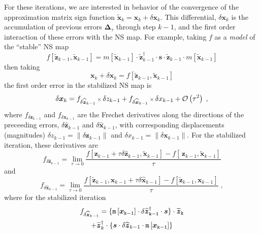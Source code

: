 \documentclass[letterpaper,twocolumn,amsmath,amsfont,amssymb,english,aps,jcp,preprintnumbers,groupaddress,nofootinbib,tightenlines]{revtex4}
\newcommand{\mat}[1]{\boldsymbol{#1}}
\begin{document}
For these iterations, we are interested in behavior of the convergence of the approximation matrix sign function 
$\widetilde{\mat{x}}_{k} = \mat{x}_{k} + \delta  \mat{x}_{k}$.  This differential, $\delta \mat{x}_k$ is the
accumulation of previous errors $\mat{\Delta}_\tau$ through step $k-1$, and the first order interaction
of these errors with the NS map.  For example, taking $f$ as a {\em model} of the ``stable'' NS map
\begin{equation}
f \left[\widetilde{\mat{z}}_{k-1} , \widetilde{\mat{x}}_{k-1} \right] =
m \left[ \widetilde{\mat{x}}_{k-1}\right] \cdot \widetilde{\mat{z}}^\dagger_{k-1}  
\cdot \mat{s} \cdot \widetilde{\mat{z}}_{k-1} \cdot m\left[ \widetilde{\mat{x}}_{k-1} \right] 
\end{equation}
then taking
\begin{equation}
\mat{x}_k + \delta \mat{x}_k = f \left[\widetilde{\mat{z}}_{k-1} , \widetilde{\mat{x}}_{k-1} \right] 
\end{equation}
the first order error in the stabilized NS map is 
\begin{equation}
\delta \mat{x}_k = {f}_{\delta \widehat{\mat{z}}_{k-1}}  \, {\scriptstyle \times} \, \delta z_{k-1} 
                 + {f}_{\delta \widehat{\mat{x}}_{k-1}}  \, {\scriptstyle \times} \, \delta x_{k-1} 
+ {\cal{O}} \left(  \tau^2 \right) \; ,
\end{equation}
where ${f}_{\delta \mat{z}_{k-1}}$ and ${f}_{\delta \mat{x}_{k-1}}$ are the Frechet derivatives along the directions of the preceeding errors, 
$\delta \widehat{\mat{z}}_{k-1}$ and $\delta \widehat{\mat{x}}_{k-1}$, with corresponding displacements (magnitudes) 
$\delta z_{k-1} = \lVert \delta \mat{z}_{k-1} \rVert$  and $\delta x_{k-1}=\lVert \delta \mat{x}_{k-1} \rVert$.  For the 
stabilized iteration, these derivatives are
\begin{equation}
f_{\delta \widehat{\mat{z}}_{k-1}} = \lim_{\tau \rightarrow 0} \frac{ f [ \mat{z}_{k-1} +\tau  \delta \widehat{\mat{z}}_{k-1}, \widetilde{\mat{x}}_{k-1} ]
-f [\, \mat{z}_{k-1}, \widetilde{\mat{x}}_{k-1} ]  }{\tau} 
\end{equation}
and 
\begin{equation}
f_{\delta \widehat{ \mat{x}}_{k-1}} = \lim_{\tau \rightarrow 0} \frac{ f [ \widetilde{\mat{z}}_{k-1}, \mat{x}_{k-1} + \tau \delta \widehat{\mat{x}}_{k-1} ]
-f [ \widetilde{\mat{z}}_{k-1}, \mat{x}_{k-1} ]  }{\tau} \; ,
\end{equation}
where for the stabilized iteration
\begin{multline}
f_{\delta \widehat{\mat{z}}_{k-1}} =
\{ \tt{m}\left[\mat{x}_{k-1} \right]  \cdot \delta {\widehat{\mat{z}}}^\dagger_{k-1} 
 \cdot \mat{s} \} \cdot \widetilde{\mat{z}}_{k} \\
+\widetilde{\mat{z}}^\dagger_{k} \cdot \{ \mat{s} \cdot \delta {\widehat{\mat{z}}}_{k-1}
\cdot \tt{m}\left[\mat{x}_{k-1} \right]    \} 
\end{multline}
\end{document}

